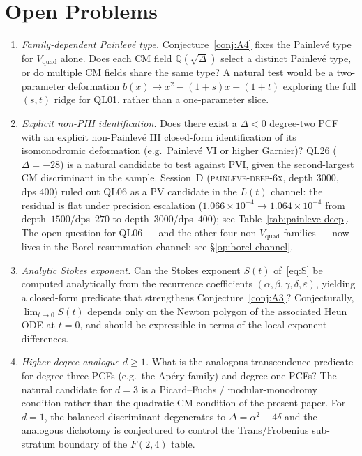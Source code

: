 \documentclass[11pt,reqno]{amsart}
\theoremstyle{definition}
\begin{document}
\section{Open Problems}\label{sec:open}

\begin{enumerate}[label={\bfseries(O\arabic*)}]
\item \emph{Family-dependent Painlev\'e type.}
Conjecture~\ref{conj:A4} fixes the Painlev\'e type for
$V_{\mathrm{quad}}$ alone. Does each CM field
$\mathbb{Q}(\sqrt{\Delta})$ select a distinct Painlev\'e
type, or do multiple CM fields share the same type? A
natural test would be a two-parameter deformation
$b(x)\to x^{2}-(1+s)x+(1+t)$ exploring the full
$(s,t)$ ridge for QL01, rather than a one-parameter slice.
\label{op:family-painleve}

\item \emph{Explicit non-PIII identification.} Does there
exist a $\Delta<0$ degree-two PCF with an explicit
non-Painlev\'e III closed-form identification of its
isomonodromic deformation (e.g.\ Painlev\'e VI or higher
Garnier)? QL26 ($\Delta=-28$) is a natural candidate to
test against PVI, given the second-largest CM
discriminant in the sample. Session~D
(\textsc{painleve-deep-6x}, depth $3000$, dps $400$) ruled
out QL06 as a PV candidate in the $L(t)$ channel: the
residual is flat under precision escalation
($1.066\times 10^{-4}\to 1.064\times 10^{-4}$ from
depth~$1500$/dps~$270$ to depth~$3000$/dps~$400$); see
Table~\ref{tab:painleve-deep}. The open question for QL06
--- and the other four non-$V_{\mathrm{quad}}$ families ---
now lives in the Borel-resummation channel; see
\S\ref{op:borel-channel}.
\label{op:non-piii}

\item \emph{Analytic Stokes exponent.} Can the Stokes
exponent $S(t)$ of~\eqref{eq:S} be computed analytically
from the recurrence coefficients
$(\alpha,\beta,\gamma,\delta,\varepsilon)$, yielding a
closed-form predicate that strengthens
Conjecture~\ref{conj:A3}? Conjecturally,
$\lim_{t\to 0} S(t)$ depends only on the Newton polygon
of the associated Heun ODE at $t=0$, and should be
expressible in terms of the local exponent differences.
\label{op:analytic-S}

\item \emph{Higher-degree analogue $d\ge 1$.} What is the
analogous transcendence predicate for degree-three PCFs
(e.g.\ the Ap\'ery family) and degree-one PCFs? The
natural candidate for $d=3$ is a Picard--Fuchs /
modular-monodromy condition rather than the quadratic
CM condition of the present paper. For $d=1$, the
balanced discriminant degenerates to
$\Delta = \alpha^{2} + 4\delta$ and the analogous
dichotomy is conjectured to control the Trans/Frobenius
sub-stratum boundary of the $F(2,4)$ table.
\label{op:dge1}


\end{enumerate}
\end{document}
